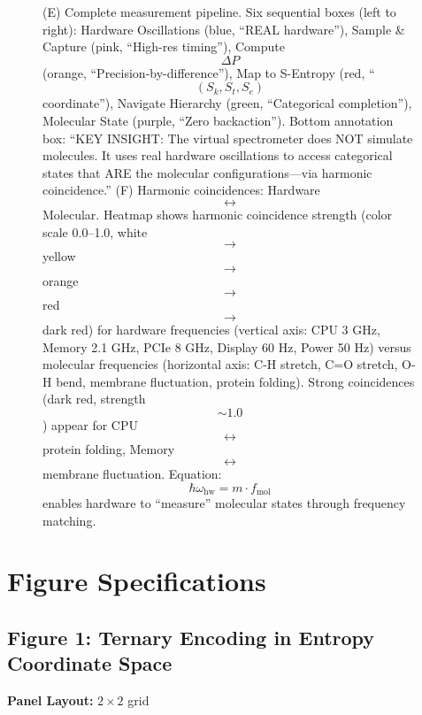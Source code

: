 \begin{figure}[htbp]
{        (E) Complete measurement pipeline. Six sequential boxes (left to right): Hardware Oscillations (blue, ``REAL hardware''), Sample \& Capture (pink, ``High-res timing''), Compute $$\Delta P$$ (orange, ``Precision-by-difference''), Map to S-Entropy (red, ``$$(S_k, S_t, S_e)$$ coordinate''), Navigate Hierarchy (green, ``Categorical completion''), Molecular State (purple, ``Zero backaction''). Bottom annotation box: ``KEY INSIGHT: The virtual spectrometer does NOT simulate molecules. It uses real hardware oscillations to access categorical states that ARE the molecular configurations—via harmonic coincidence.'' 
        (F) Harmonic coincidences: Hardware $$\leftrightarrow$$ Molecular. Heatmap shows harmonic coincidence strength (color scale 0.0--1.0, white $$\to$$ yellow $$\to$$ orange $$\to$$ red $$\to$$ dark red) for hardware frequencies (vertical axis: CPU 3 GHz, Memory 2.1 GHz, PCIe 8 GHz, Display 60 Hz, Power 50 Hz) versus molecular frequencies (horizontal axis: C-H stretch, C=O stretch, O-H bend, membrane fluctuation, protein folding). Strong coincidences (dark red, strength $$\sim 1.0$$) appear for CPU $$\leftrightarrow$$ protein folding, Memory $$\leftrightarrow$$ membrane fluctuation. Equation: $$\hbar\omega_{\text{hw}} = m \cdot f_{\text{mol}}$$ enables hardware to ``measure'' molecular states through frequency matching.}
        \label{fig:hardware_virtual_spectrometer}
        \end{figure}
              

\section*{Figure Specifications}


\subsection*{Figure 1: Ternary Encoding in Entropy Coordinate Space}

\textbf{Panel Layout:} $2 \times 2$ grid

